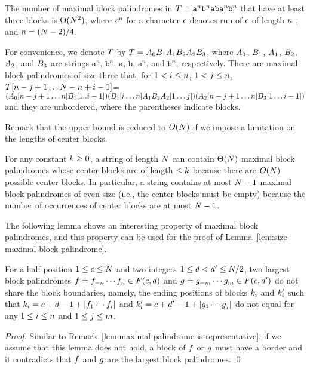 \begin{examplex}
	\label{lem:bound-of-num-maximal-palindromes}
	The number of maximal block palindromes in $T=\mathtt{a}^n\mathtt{b}^n\mathtt{a}\mathtt{b}\mathtt{a}^n\mathtt{b}^n$ that have at least three blocks is $\Theta(N^2)$, where $c^n$ for a character $c$ denotes run of $c$ of length $n$ , and $n=(N-2)/4$.
\end{examplex}
For convenience, we denote $T$ by $T=A_0 B_1 A_1 B_2 A_2 B_3$, where $A_0$, $B_1$, $A_1$, $B_2$, $A_2$, and $B_3$ are strings $\mathtt{a}^n$, $\mathtt{b}^n$, $\mathtt{a}$, $\mathtt{b}$, $\mathtt{a}^n$, and $\mathtt{b}^n$, respectively.
There are maximal block palindromes of size three that, for $1<i \leq n$, $1<j \leq n$, $T[n-j+1 \ldots N-n+i-1]$=$(A_0[n-j+1 \ldots n] B_1[1..i-1])(B_1[i \ldots n]A_1 B_2 A_2[1 \ldots j])(A_2[n-j+1 \ldots n]B_3[1 \ldots i-1])$ and they are unbordered, where the parentheses indicate blocks.



Remark that the upper bound is reduced to $O(N)$ if we impose a limitation on the lengths of center blocks.
\begin{remarkx}
	\label{lem:limited-center-block}
  For any constant $k \ge 0$, a string of length $N$ can contain $\Theta(N)$
  maximal block palindromes whose center blocks are of length $\le k$ because there are $O(N)$ possible center blocks.
  In particular, a string contains at most $N - 1$ maximal block palindromes of even size (i.e., the center blocks must be empty)
  because the number of occurrences of center blocks are at most $N-1$.
\end{remarkx}



The following lemma shows an interesting property of maximal block palindromes, and this property can be used for the proof of Lemma~\ref{lem:size-maximal-block-palindrome}.
\begin{lemma}
	\label{lem:there-is-no-same-starting-positions-of-factors}
  For a half-position $1 \leq c \leq N$ and two integers $1 \leq d<d^\prime \leq N/2$, two largest block palindromes $f=f_{-n} \cdots f_{n} \in F(c, d)$ and $g = g_{-m} \cdots g_{m} \in F(c, d^\prime)$ do not share the block boundaries, namely, the ending positions of blocks $k_i$ and $k^\prime_i$ such that $k_i=c + d -1 + |f_1 \cdots f_i|$ and $k^\prime_i=c + d^\prime -1 + |g_1 \cdots g_j|$ do not equal for any $1 \leq i \leq n$ and $1 \leq j \leq m$.
\end{lemma}
\begin{proof}
  Similar to Remark~\ref{lem:maximal-palindrome-is-representative}, if we assume that this lemma does not hold, a block of $f$ or $g$ must have a border and it contradicts that $f$ and $g$ are the largest block palindromes.
	\qed
\end{proof}

